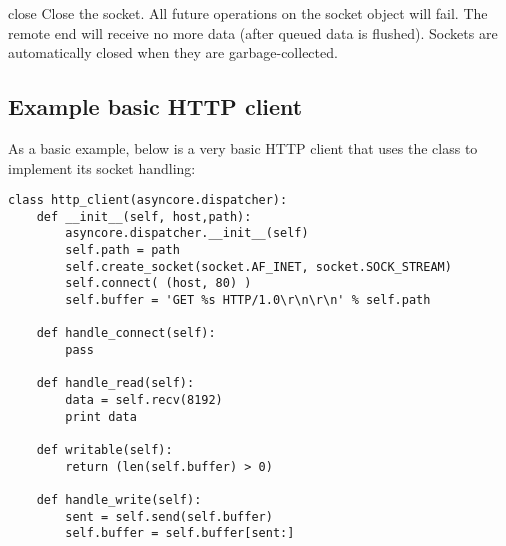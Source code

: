\begin{methoddesc}{close}{}
  Close the socket.  All future operations on the socket object
  will fail.  The remote end will receive no more data (after
  queued data is flushed).  Sockets are automatically closed
  when they are garbage-collected.
\end{methoddesc}


\subsection{Example basic HTTP client \label{asyncore-example}}

As a basic example, below is a very basic HTTP client that uses the 
 class to implement its socket handling:

\begin{verbatim}
class http_client(asyncore.dispatcher):
    def __init__(self, host,path):
        asyncore.dispatcher.__init__(self)
        self.path = path
        self.create_socket(socket.AF_INET, socket.SOCK_STREAM)
        self.connect( (host, 80) )
        self.buffer = 'GET %s HTTP/1.0\r\n\r\n' % self.path
        
    def handle_connect(self):
        pass
        
    def handle_read(self):
        data = self.recv(8192)
        print data
        
    def writable(self):
        return (len(self.buffer) > 0)
    
    def handle_write(self):
        sent = self.send(self.buffer)
        self.buffer = self.buffer[sent:]
\end{verbatim}
